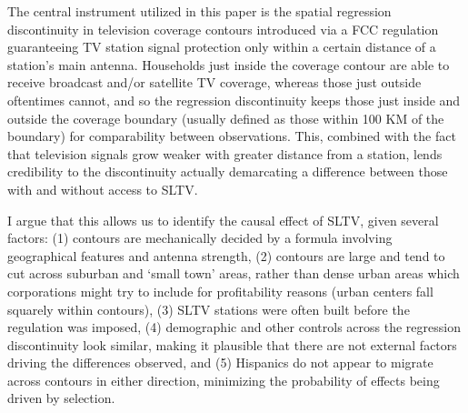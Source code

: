 \documentclass[11pt]{article}
\begin{document}



The central instrument utilized in this paper is the spatial regression discontinuity in television coverage contours introduced via a FCC regulation guaranteeing TV station signal protection only within a certain distance of a station's main antenna. Households just inside the coverage contour are able to receive broadcast and/or satellite TV coverage, whereas those just outside oftentimes cannot, and so the regression discontinuity keeps those just inside and outside the coverage boundary (usually defined as those within 100 KM of the boundary) for comparability between observations. This, combined with the fact that television signals grow weaker with greater distance from a station, lends credibility to the discontinuity actually demarcating a difference between those with and without access to SLTV.

I argue that this allows us to identify the causal effect of SLTV, given several factors: (1) contours are mechanically decided by a formula involving geographical features and antenna strength, (2) contours are large and tend to cut across suburban and `small town' areas, rather than dense urban areas which corporations might try to include for profitability reasons (urban centers fall squarely within contours), (3) SLTV stations were often built before the regulation was imposed, (4) demographic and other controls across the regression discontinuity look similar, making it plausible that there are not external factors driving the differences observed, and (5) Hispanics do not appear to migrate across contours in either direction, minimizing the probability of effects being driven by selection.
\end{document}
